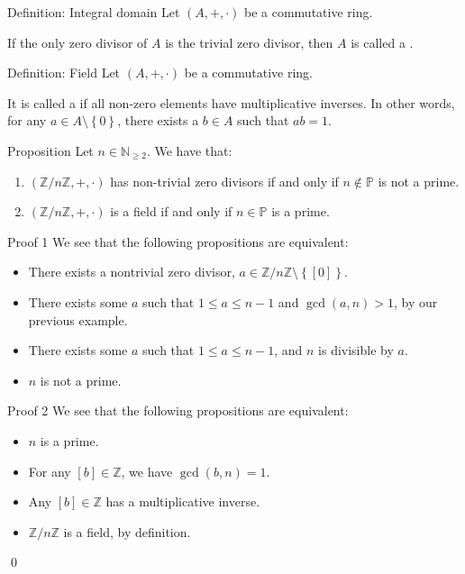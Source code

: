 \documentclass[a4paper]{article}
\begin{document}
\begin{parag}{Definition: Integral domain}
    Let $\left(A, +, \cdot \right)$ be a commutative ring.

    If the only zero divisor of $A$ is the trivial zero divisor, then $A$ is called a .
\end{parag}

\begin{parag}{Definition: Field}
    Let $\left(A, +, \cdot \right)$ be a commutative ring.

    It is called a  if all non-zero elements have multiplicative inverses. In other words, for any $a \in A \setminus \left\{0\right\}$, there exists a $b \in A$ such that $ab = 1$.
\end{parag}

\begin{parag}{Proposition}
    Let $n \in \mathbb{N}_{\geq 2}$. We have that:
    \begin{enumerate}
        \item $\left(\mathbb{Z}/n\mathbb{Z}, +, \cdot \right)$ has non-trivial zero divisors if and only if $n \not \in \mathbb{P}$ is not a prime.
        \item $\left(\mathbb{Z}/n\mathbb{Z}, +, \cdot \right)$ is a field if and only if $n \in \mathbb{P}$ is a prime.
    \end{enumerate}

    \begin{subparag}{Proof 1}
        We see that the following propositions are equivalent:
        \begin{itemize}
            \item There exists a nontrivial zero divisor, $a \in \mathbb{Z}/n\mathbb{Z} \setminus \left\{\left[0\right]\right\}$.
            \item There exists some $a$ such that $1 \leq a \leq n-1$ and $\gcd\left(a, n\right) > 1$, by our previous example.
            \item There exists some $a$ such that $1 \leq a \leq n-1$, and $n$ is divisible by $a$.
            \item $n$ is not a prime.
        \end{itemize}
    \end{subparag} 

    \begin{subparag}{Proof 2}
        We see that the following propositions are equivalent:
        \begin{itemize}
            \item $n$ is a prime.
            \item For any $\left[b\right] \in \mathbb{Z}$, we have $\gcd\left(b, n\right) = 1$.
            \item Any $\left[b\right] \in \mathbb{Z}$ has a multiplicative inverse.
            \item $\mathbb{Z}/n\mathbb{Z}$ is a field, by definition. 
        \end{itemize}

        \qed
    \end{subparag}
\end{parag}
\end{document}
